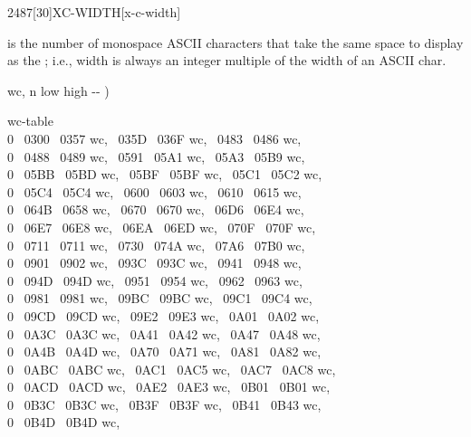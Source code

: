 \begin{worddef}{2487}[30]{XC-WIDTH}[x-c-width]%
\item {}

	 is the number of monospace ASCII characters that take the same
	space to display as the ; i.e.,  width is always
	an integer multiple of the width of an ASCII char.

	\begin{implement} %
	\word{:} wc,  n low high -{}- )   \word{,} \word{,} \word{,} \word{;}

	 wc-table   \\
	0 ~0300 ~0357 wc, ~035D ~036F wc, ~0483 ~0486 wc,\\
	0 ~0488 ~0489 wc, ~0591 ~05A1 wc, ~05A3 ~05B9 wc,\\
	0 ~05BB ~05BD wc, ~05BF ~05BF wc, ~05C1 ~05C2 wc,\\
	0 ~05C4 ~05C4 wc, ~0600 ~0603 wc, ~0610 ~0615 wc,\\
	0 ~064B ~0658 wc, ~0670 ~0670 wc, ~06D6 ~06E4 wc,\\
	0 ~06E7 ~06E8 wc, ~06EA ~06ED wc, ~070F ~070F wc,\\
	0 ~0711 ~0711 wc, ~0730 ~074A wc, ~07A6 ~07B0 wc,\\
	0 ~0901 ~0902 wc, ~093C ~093C wc, ~0941 ~0948 wc,\\
	0 ~094D ~094D wc, ~0951 ~0954 wc, ~0962 ~0963 wc,\\
	0 ~0981 ~0981 wc, ~09BC ~09BC wc, ~09C1 ~09C4 wc,\\
	0 ~09CD ~09CD wc, ~09E2 ~09E3 wc, ~0A01 ~0A02 wc,\\
	0 ~0A3C ~0A3C wc, ~0A41 ~0A42 wc, ~0A47 ~0A48 wc,\\
	0 ~0A4B ~0A4D wc, ~0A70 ~0A71 wc, ~0A81 ~0A82 wc,\\
	0 ~0ABC ~0ABC wc, ~0AC1 ~0AC5 wc, ~0AC7 ~0AC8 wc,\\
	0 ~0ACD ~0ACD wc, ~0AE2 ~0AE3 wc, ~0B01 ~0B01 wc,\\
	0 ~0B3C ~0B3C wc, ~0B3F ~0B3F wc, ~0B41 ~0B43 wc,\\
	0 ~0B4D ~0B4D wc,\tab[2]

\end{implement}
\end{worddef}
